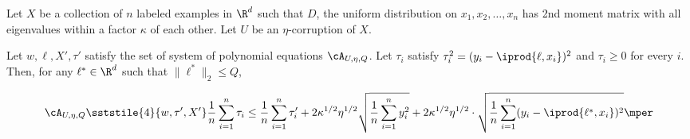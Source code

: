 \begin{lemma} \label{lem:robust-certifiability-L1-SoS}

Let $X$ be a collection of $n$ labeled examples in $\R^d$ such that $D$, the uniform distribution on  $x_1, x_2, \ldots, x_n$ has 2nd moment matrix with all eigenvalues within a factor $\kappa$ of each other. Let $U$ be an $\eta$-corruption of $X$.

Let $w,\ell,X', \tau'$ satisfy the set of system of polynomial equations $\cA_{U,\eta,Q}$. Let $\tau_i$ satisfy $\tau_i^2 = (y_i - \iprod{\ell,x_i})^2$ and $\tau_i \geq 0$ for every $i$. Then, for any $\ell^{*} \in \R^d$ such that $\|\ell^{*}\|_2 \leq Q$,



\[
\cA_{U,\eta,Q} \sststile{4}{w,\tau',X'} \frac{1}{n} \sum_{i = 1}^n \tau_i \leq \frac{1}{n} \sum_{i = 1}^n \tau_i' + 2\kappa^{1/2} \eta^{1/2} \sqrt{\frac{1}{n} \sum_{i = 1}^n y_i^2} + 2 \kappa^{1/2} \eta^{1/2} \cdot \sqrt{ \frac{1}{n} \sum_{i = 1}^n (y_i - \iprod{\ell^{*},x_i})^2}\mper
\]





\end{lemma}
